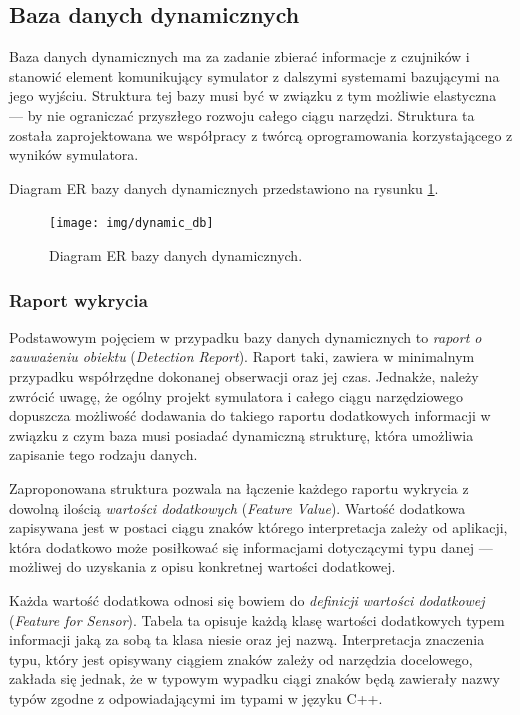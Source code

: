 {\subsection{Baza danych dynamicznych}
\par{
Baza danych dynamicznych ma za zadanie zbierać informacje z czujników i stanowić element komunikujący symulator z dalszymi systemami bazującymi na jego wyjściu. Struktura tej bazy musi być w związku z tym możliwie elastyczna --- by nie ograniczać przyszłego rozwoju całego ciągu narzędzi. Struktura ta została zaprojektowana we współpracy z twórcą oprogramowania korzystającego z wyników symulatora.
}
\par{
Diagram ER bazy danych dynamicznych przedstawiono na rysunku \ref{dynamic_db}.
}
\begin{figure}[htb]
    \begin{center}
	\texttt{[image: img/dynamic\_db]}
	\caption{Diagram ER bazy danych dynamicznych.}
	\label{dynamic_db}
    \end{center}
\end{figure}

\subsubsection{Raport wykrycia}
\par{
Podstawowym pojęciem w przypadku bazy danych dynamicznych to \textit{raport o zauważeniu obiektu} (\textit{Detection Report}). Raport taki, zawiera w minimalnym przypadku współrzędne dokonanej obserwacji oraz jej czas. Jednakże, należy zwrócić uwagę, że ogólny projekt symulatora i całego ciągu narzędziowego dopuszcza możliwość dodawania do takiego raportu dodatkowych informacji w związku z czym baza musi posiadać dynamiczną strukturę, która umożliwia zapisanie tego rodzaju danych.
}
\par{
Zaproponowana struktura pozwala na łączenie każdego raportu wykrycia z dowolną ilością \textit{wartości dodatkowych} (\textit{Feature Value}). Wartość dodatkowa  zapisywana jest w postaci ciągu znaków którego interpretacja zależy od aplikacji, która dodatkowo może posiłkować się informacjami dotyczącymi typu danej --- możliwej do uzyskania z opisu konkretnej wartości dodatkowej.
}
\par{
Każda wartość dodatkowa odnosi się bowiem do \textit{definicji wartości dodatkowej} (\textit{Feature for Sensor}). Tabela ta opisuje każdą klasę wartości dodatkowych typem informacji jaką za sobą ta klasa niesie oraz jej nazwą. Interpretacja znaczenia typu, który jest opisywany ciągiem znaków zależy od narzędzia docelowego, zakłada się jednak, że w typowym wypadku ciągi znaków będą zawierały nazwy typów zgodne z odpowiadającymi im typami w języku C++.
}
}

